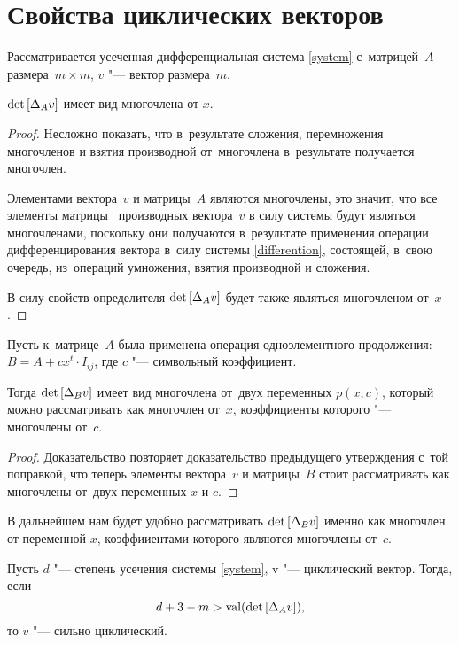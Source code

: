 \section{Свойства циклических векторов}

Рассматривается усеченная дифференциальная система \eqref{system} с~матрицей~$A$ размера~$m \times m$,
$v$ "--- вектор размера~$m$.


\begin{proposition}
    $\mathop{\rm det}\text{$ [\Delta_A v] $}$ имеет вид многочлена от $x$.
\end{proposition}

\begin{proof}
    Несложно показать, что в~результате сложения, перемножения многочленов и взятия производной от~многочлена
    в~результате получается многочлен.
    
    Элементами вектора~$v$ и матрицы~$A$ являются многочлены,
    это значит, что все элементы матрицы \diffMatrix\ производных вектора~$v$ в силу системы
    будут являться многочленами, поскольку они получаются в~результате применения
    операции дифференцирования вектора в~силу системы \eqref{differention},
    состоящей, в~свою очередь, из~операций умножения, взятия производной и сложения.
    
    В силу свойств определителя $\mathop{\rm det}\text{$ [\Delta_A v] $}$ будет также являться многочленом от~$x$.
\end{proof}


\begin{proposition}
    Пусть к~матрице~$A$ была применена операция одноэлементного продолжения:
    $B = A + cx^t \cdot I_{ij}$, где $c$ "--- символьный коэффициент.
    
    Тогда $\mathop{\rm det}\text{$ [\Delta_B v] $}$ имеет вид многочлена от~двух переменных $p(x, c)$,
    который можно рассматривать как многочлен от~$x$, коэффициенты которого "--- многочлены от~$c$.
\end{proposition}

\begin{proof}
    Доказательство повторяет доказательство предыдущего утверждения с~той поправкой,
    что теперь элементы вектора~$v$ и матрицы~$B$ стоит рассматривать как многочлены от~двух переменных $x$ и $c$.
\end{proof}

В дальнейшем нам будет удобно рассматривать $\mathop{\rm det}\text{$ [\Delta_B v] $}$
именно как многочлен от переменной $x$, коэффииентами которого являются многочлены от~$c$.


\begin{proposition}
Пусть $d$ "--- степень усечения системы \eqref{system}, v "--- циклический вектор. Тогда, если
\begin{equation}
	d + 3 - m > \mathop{\rm val}(\mathop{\rm det}\text{$ [\Delta_A v] $}),
	\label{d3m}
\end{equation}
то $v$ "--- сильно циклический.

\end{proposition}

